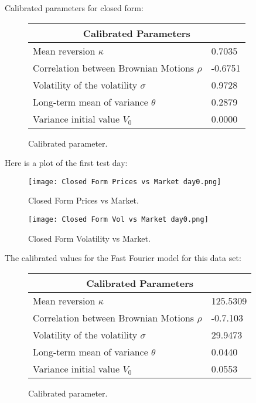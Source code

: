 \documentclass[fontsize=12pt]{article}
\numberwithin{equation}{section} %
\numberwithin{figure}{section} %
\numberwithin{table}{section} %
\begin{document}
Calibrated parameters for closed form:

\begin{figure}[H]
\centering
\begin{tabular}{| p{6.5cm}| p{2.0cm} |}
\hline
\multicolumn{2}{|c|}{Calibrated Parameters} \\
\hline
Mean reversion $\kappa$ & 0.7035 \\ \hline
Correlation between Brownian Motions $\rho$ & -0.6751 \\ \hline
Volatility of the volatility $\sigma$ & 0.9728 \\ \hline
Long-term mean of variance $\theta$ & 0.2879 \\ \hline
Variance initial value $V_0$ & 0.0000 \\ \hline
\end{tabular}
\caption{Calibrated parameter.}
\label{tabla:Calibrated Parameters Closed Form}
\end{figure}



Here is a plot of the first test day:


\begin{figure}[H]
  \centering
   \texttt{[image: Closed Form Prices vs Market day0.png]}
  \caption{Closed Form Prices vs Market.}
  \label{fig:CF Prices}
\end{figure}

\begin{figure}[H]
  \centering
   \texttt{[image: Closed Form Vol vs Market day0.png]}
  \caption{Closed Form Volatility vs Market.}
  \label{fig:CF Prices2}
\end{figure}


The calibrated values for the Fast Fourier model for this data set:

\begin{figure}[H]
\centering
\begin{tabular}{| p{6.5cm}| p{2.0cm} |}
\hline
\multicolumn{2}{|c|}{Calibrated Parameters} \\
\hline
Mean reversion $\kappa$ & 125.5309 \\ \hline
Correlation between Brownian Motions $\rho$ & -0.7.103 \\ \hline
Volatility of the volatility $\sigma$ & 29.9473 \\ \hline
Long-term mean of variance $\theta$ & 0.0440 \\ \hline
Variance initial value $V_0$ & 0.0553 \\ \hline
\end{tabular}
\caption{Calibrated parameter.}
\label{tabla:Calibrated Parameters Closed Form}
\end{figure}
\end{document}
